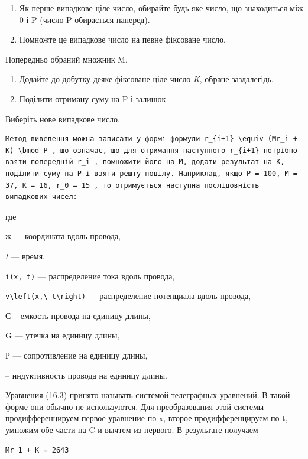 \documentclass[
  ukrainian,
]{article}
\begin{document}
\begin{enumerate}
\def\labelenumi{\arabic{enumi}.}
\item
  Як перше випадкове ціле число, обирайте будь-яке число, що знаходиться
  між 0 і P (число P обирається наперед).
\item
  Помножте це випадкове число на певне фіксоване число.
\end{enumerate}

Попередньо обраний множник M.

\begin{enumerate}
\def\labelenumi{\arabic{enumi}.}
\setcounter{enumi}{2}
\item
  Додайте до добутку деяке фіксоване ціле число \emph{K}, обране
  заздалегідь.
\item
  Поділити отриману суму на P і залишок
\end{enumerate}

Виберіть нове випадкове число.

\begin{verbatim}
Метод виведення можна записати у формі формули r_{i+1} \equiv (Mr_i + K) \bmod P , що означає, що для отримання наступного r_{i+1} потрібно взяти попередній r_i , помножити його на M, додати результат на K, поділити суму на P і взяти решту поділу. Наприклад, якщо P = 100, M = 37, K = 16, r_0 = 15 , то отримується наступна послідовність випадкових чисел:
\end{verbatim}

где

ж --- координата вдоль провода,

\emph{t} --- время,

\texttt{i(x,\ t)} --- распределение тока вдоль провода,

\texttt{v\textbackslash{}left(x,\textbackslash{}\ t\textbackslash{}right)}
--- распределение потенциала вдоль провода,

С -- емкость провода на единицу длины,

G --- утечка на единицу длины,

Р --- сопротивление на единицу длины,

-- индуктивность провода на единицу длины.

Уравнения (16.3) принято называть системой телеграфных уравнений. В
такой форме они обычно не используются. Для преобразования этой системы
продифференцируем первое уравнение по x, второе продифференцируем по t,
умножим обе части на C и вычтем из первого. В результате получаем

\begin{verbatim}
Mr_1 + K = 2643
\end{verbatim}
\end{document}

